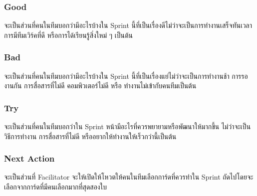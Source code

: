 \subsubsection{Good}
จะเป็นส่วนที่คนในทีมบอกว่ามีอะไรบ้างใน Sprint นี้ที่เป็นเรื่องดีไม่ว่าจะเป็นการทำงานเสร็จทันเวลา การมีทีมเวิร์คที่ดี หรือการได้เรียนรู้สิ่งใหม่ ๆ
เป็นต้น
\subsubsection{Bad}
จะเป็นส่วนที่คนในทีมบอกว่ามีอะไรบ้างใน Sprint นี้ที่เป็นเรื่องแย่ไม่ว่าจะเป็นการทำงานช้า การรองานกัน การสื่อสารที่ไม่ดี คอมพิวเตอร์ไม่ดี หรือ
ทำงานไม่เข้ากับคนทีมเป็นต้น
\subsubsection{Try}
จะเป็นส่วนที่คนในทีมบอกว่าใน Sprint หน้ามีอะไรที่ควรพยายามหรือพัฒนาให้มากขึ้น ไม่ว่าจะเป็นวิธีการทำงาน การสื่อสารที่ไม่ดี หรืออยากให้ทำงานให้เร็วกว่านี้เป็นต้น
\subsubsection{Next Action}
จะเป็นส่วนที่ Facilitator จะให้เปิดให้โหวตให้คนในทีมเลือกการ์ดที่ควรทำใน Sprint ถัดไปโดยจะเลือกจากการ์ดที่มีคนเลือกมากที่สุดสองใบ

